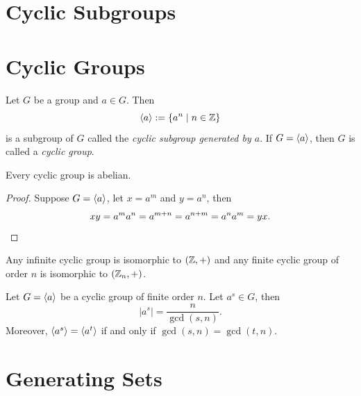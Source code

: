 \section{Cyclic Subgroups}

\section{Cyclic Groups}
\begin{definition}
  Let \(G\) be a group and \(a\in G\). Then \[
    \langle a\rangle := \{a^n \mid n\in\mathbb{Z}\}
  \] is a subgroup of \(G\) called the \emph{cyclic subgroup generated by \(a\)}. If \(G = \langle a\rangle\), then \(G\) is called a \emph{cyclic group}.
\end{definition}

\begin{proposition}
  Every cyclic group is abelian.
\end{proposition}
\begin{proof}
  Suppose \(G = \langle a\rangle\), let \(x = a^m\) and \(y = a^n\), then \[
    xy = a^ma^n = a^{m+n} = a^{n+m} = a^na^m = yx.\qedhere
  \]
\end{proof}

\begin{theorem}
  Any infinite cyclic group is isomorphic to \((\mathbb{Z},+)\) and any finite cyclic group of order \(n\) is isomorphic to \((\mathbb{Z}_n,+)\).
\end{theorem}

\begin{theorem}
  Let \(G = \langle a\rangle\) be a cyclic group of finite order \(n\). Let \(a^s\in G\), then \[
    |a^s| = \frac{n}{\gcd(s,n)}.
  \] Moreover, \(\langle a^s\rangle = \langle a^t\rangle\) if and only if \(\gcd(s,n) = \gcd(t,n)\).
\end{theorem}

\section{Generating Sets}